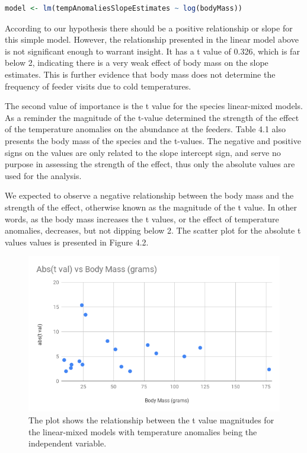 \begin{lstlisting}[language=R]
model <- lm(tempAnomaliesSlopeEstimates ~ log(bodyMass))
\end{lstlisting}

According to our hypothesis there should be a positive relationship or slope for this simple model. However, the relationship presented in the linear model above is not significant enough to warrant insight. It has a t value of 0.326, which is far below 2, indicating there is a very weak effect of body mass on the slope estimates. This is further evidence that body mass does not determine the frequency of feeder visits due to cold temperatures. 

The second value of importance is the t value for the species linear-mixed models. As a reminder the magnitude of the t-value determined the strength of the effect of the temperature anomalies on the abundance at the feeders. Table 4.1 also presents the body mass of the species and the t-values. The negative and positive signs on the values are only related to the slope intercept sign, and serve no purpose in assessing the strength of the effect, thus only the absolute values are used for the analysis.

We expected to observe a negative relationship between the body mass and the strength of the effect, otherwise known as the magnitude of the t value. In other words, as the body mass increases the t values, or the effect of temperature anomalies, decreases, but not dipping below 2. The scatter plot for the absolute t values  values is presented in Figure 4.2.

\begin{figure}[h]
\centering
\includegraphics[width=1.0\textwidth]{figures/tValBodyMass.png}
\caption{The plot shows the relationship between the t value magnitudes for the linear-mixed models with temperature anomalies being the independent variable.}
\end{figure}

